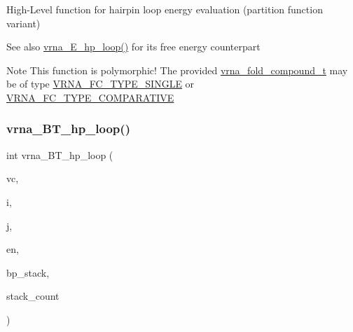 High-\/\+Level function for hairpin loop energy evaluation (partition function variant) 

\begin{DoxySeeAlso}{See also}
\mbox{\hyperlink{group__loops_ga999ba163a8148d72fd5f22819a681df7}{vrna\+\_\+\+E\+\_\+hp\+\_\+loop()}} for it\textquotesingle{}s free energy counterpart
\end{DoxySeeAlso}
\begin{DoxyNote}{Note}
This function is polymorphic! The provided \mbox{\hyperlink{group__fold__compound_ga1b0cef17fd40466cef5968eaeeff6166}{vrna\+\_\+fold\+\_\+compound\+\_\+t}} may be of type \mbox{\hyperlink{group__fold__compound_gga01a4ff86fa71deaaa5d1abbd95a1447da7e264dd3cf2dc9b6448caabcb7763cd6}{V\+R\+N\+A\+\_\+\+F\+C\+\_\+\+T\+Y\+P\+E\+\_\+\+S\+I\+N\+G\+LE}} or \mbox{\hyperlink{group__fold__compound_gga01a4ff86fa71deaaa5d1abbd95a1447dab821ce46ea3cf665be97df22a76f5023}{V\+R\+N\+A\+\_\+\+F\+C\+\_\+\+T\+Y\+P\+E\+\_\+\+C\+O\+M\+P\+A\+R\+A\+T\+I\+VE}} 
\end{DoxyNote}
\mbox{\label{group__loops_ga6c4ba14d24f716d0ca9021771357e903}} 
\subsubsection{\texorpdfstring{vrna\+\_\+\+B\+T\+\_\+hp\+\_\+loop()}{vrna\_BT\_hp\_loop()}}
{\footnotesize\ttfamily int vrna\+\_\+\+B\+T\+\_\+hp\+\_\+loop (\begin{DoxyParamCaption}\item[{\mbox{\hyperlink{group__fold__compound_ga1b0cef17fd40466cef5968eaeeff6166}{vrna\+\_\+fold\+\_\+compound\+\_\+t}} $\ast$}]{vc,  }\item[{int}]{i,  }\item[{int}]{j,  }\item[{int}]{en,  }\item[{\mbox{\hyperlink{group__data__structures_gaa651bda42e7692f08cb603cd6834b0ee}{vrna\+\_\+bp\+\_\+stack\+\_\+t}} $\ast$}]{bp\+\_\+stack,  }\item[{int $\ast$}]{stack\+\_\+count }\end{DoxyParamCaption})}



